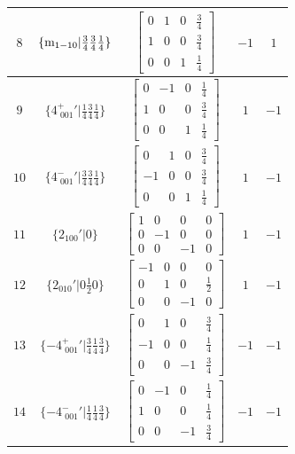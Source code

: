 \documentclass[fleqn,8pt]{jsarticle}
\begin{document}
\begin{longtable}{ccccc}
$ 8 $ & $ \{{\rm m}_{1-10}|\frac{3}{4} \frac{3}{4} \frac{1}{4}\} $ & $ \begin{bmatrix} 0 & 1 & 0 & \frac{3}{4} \\ 1 & 0 & 0 & \frac{3}{4} \\ 0 & 0 & 1 & \frac{1}{4} \end{bmatrix} $ & $ -1 $ & $ 1 $ \\ \hline
$ 9 $ & $ \{4^{+}_{\,\,001}{}'|\frac{1}{4} \frac{3}{4} \frac{1}{4}\} $ & $ \begin{bmatrix} 0 & -1 & 0 & \frac{1}{4} \\ 1 & 0 & 0 & \frac{3}{4} \\ 0 & 0 & 1 & \frac{1}{4} \end{bmatrix} $ & $ 1 $ & $ -1 $ \\ \hline
$ 10 $ & $ \{4^{-}_{\,\,001}{}'|\frac{3}{4} \frac{3}{4} \frac{1}{4}\} $ & $ \begin{bmatrix} 0 & 1 & 0 & \frac{3}{4} \\ -1 & 0 & 0 & \frac{3}{4} \\ 0 & 0 & 1 & \frac{1}{4} \end{bmatrix} $ & $ 1 $ & $ -1 $ \\ \hline
$ 11 $ & $ \{2{}_{100}{}'|0\} $ & $ \begin{bmatrix} 1 & 0 & 0 & 0 \\ 0 & -1 & 0 & 0 \\ 0 & 0 & -1 & 0 \end{bmatrix} $ & $ 1 $ & $ -1 $ \\ \hline
$ 12 $ & $ \{2{}_{010}{}'|0 \frac{1}{2} 0\} $ & $ \begin{bmatrix} -1 & 0 & 0 & 0 \\ 0 & 1 & 0 & \frac{1}{2} \\ 0 & 0 & -1 & 0 \end{bmatrix} $ & $ 1 $ & $ -1 $ \\ \hline
$ 13 $ & $ \{-4^{+}_{\,\,001}{}'|\frac{3}{4} \frac{1}{4} \frac{3}{4}\} $ & $ \begin{bmatrix} 0 & 1 & 0 & \frac{3}{4} \\ -1 & 0 & 0 & \frac{1}{4} \\ 0 & 0 & -1 & \frac{3}{4} \end{bmatrix} $ & $ -1 $ & $ -1 $ \\ \hline
$ 14 $ & $ \{-4^{-}_{\,\,001}{}'|\frac{1}{4} \frac{1}{4} \frac{3}{4}\} $ & $ \begin{bmatrix} 0 & -1 & 0 & \frac{1}{4} \\ 1 & 0 & 0 & \frac{1}{4} \\ 0 & 0 & -1 & \frac{3}{4} \end{bmatrix} $ & $ -1 $ & $ -1 $ \\ \hline

\end{longtable}
\end{document}
